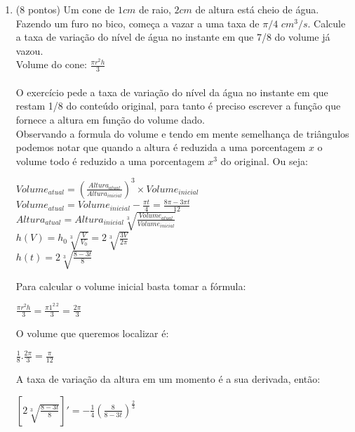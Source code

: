 \documentclass[12pt]{article}
\begin{document}
\begin{enumerate}
\begin{enumerate}
	\end{enumerate}
	\item (8 pontos) Um cone de $1 cm$ de raio, $2 cm$ de altura está cheio de água. Fazendo um furo no bico, começa a vazar a uma taxa de $\pi/4$ $cm^3/s$. Calcule a taxa de variação do nível de água no instante em que 7/8 do volume já vazou.\\Volume do cone: $\frac{\pi r^2 h}{3}$\\
	\\
	O exercício pede a taxa de variação do nível da água no instante em que restam 1/8 do conteúdo original, para tanto é preciso escrever a função que fornece a altura em função do volume dado.\\
	Observando a formula do volume e tendo em mente semelhança de triângulos podemos notar que quando a altura é reduzida a uma porcentagem $x$ o volume todo é reduzido a uma porcentagem $x^3$ do original. Ou seja:\\
	
	\begin{center}
		$ Volume_{atual} = \left( \frac{Altura_{atual}}{Altura_{inicial}} \right)^3 \times Volume_{inicial} $\\
		$ Volume_{atual} = Volume_{inicial} - \frac{\pi t}{4} = \frac{8\pi - 3\pi t}{12}$\\
		$ Altura_{atual} = Altura_{inicial} \sqrt[3]{\frac{Volume_{atual} }{Volume_{inicial} } }$\\
		
		$ h(V) = h_{0} \sqrt[3]{\frac{V}{V_{0} } } = 2\sqrt[3]{\frac{3V}{2\pi}}   $\\
		
		$ h(t) = 2 \sqrt[3]{\frac{8 - 3t}{8} }$\\
	\end{center}
	
	Para calcular o volume inicial basta tomar a fórmula:
	
	\begin{center}
		$\frac{\pi r^2 h}{3} = \frac{\pi 1^2.2}{3} = \frac{2\pi}{3}$
	\end{center}
	
	O volume que queremos localizar é:
	
	\begin{center}
		$\frac{1}{8}.\frac{2\pi}{3} = \frac{\pi}{12}$
	\end{center}
	
	A taxa de variação da altura em um momento é a sua derivada, então:
	
	\begin{center}
		$ \left[ 2 \sqrt[3]{\frac{8 - 3t}{8}} \right] ' = -\frac{1}{4} \left( \frac{8}{8-3t}\right) ^{\frac{2}{3}} $\\
	\end{center}
	

\end{enumerate}
\end{document}
